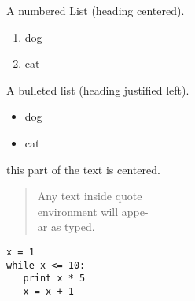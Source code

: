 \documentclass{article}
\date=06
\begin{document}
\begin{center}
A numbered List (heading centered).
\end{center}

\begin{enumerate}
\item dog
\item cat
\end{enumerate}

\begin{flushleft}
A bulleted list (heading justified left).
\end{flushleft}

\begin{itemize}
\item dog
\item cat
\end{itemize}

\begin{flushright}
this part of the text is centered.
\end{flushright}

\begin{quote}
Any text inside quote\\
environment will appe-\\
ar as typed.\\
\end{quote}

\begin{verbatim}
x = 1
while x <= 10:
   print x * 5
   x = x + 1
\end{verbatim}
\end{document}
